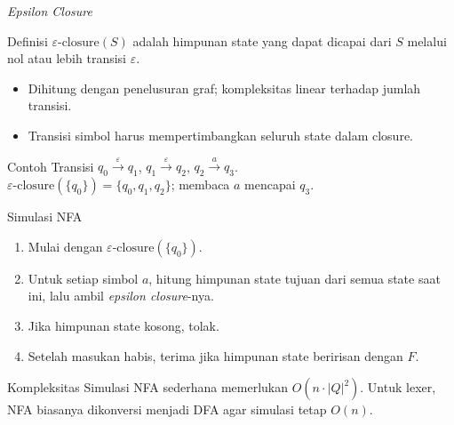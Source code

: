 \documentclass[aspectratio=169,10pt,t]{beamer}
\begin{document}
\begin{frame}{\textit{Epsilon Closure}}
  \begin{block}{Definisi}
    \small
    \(\varepsilon\text{-closure}(S)\) adalah himpunan state yang dapat
    dicapai dari \(S\) melalui nol atau lebih transisi
    \(\varepsilon\).
  \end{block}

  \begin{itemize}
    \item Dihitung dengan penelusuran graf; kompleksitas linear terhadap
          jumlah transisi.
    \item Transisi simbol harus mempertimbangkan seluruh state dalam
          closure.
  \end{itemize}

  \vspace{3pt}
  \begin{exampleblock}{Contoh}
    \footnotesize
    Transisi \(q_0 \xrightarrow{\varepsilon} q_1\),
    \(q_1 \xrightarrow{\varepsilon} q_2\),
    \(q_2 \xrightarrow{a} q_3\).\\
    \(\varepsilon\text{-closure}(\{q_0\}) = \{q_0,q_1,q_2\}\);
    membaca \(a\) mencapai \(q_3\).
  \end{exampleblock}
\end{frame}

\begin{frame}{Simulasi NFA}
  \begin{enumerate}
    \setlength{\itemsep}{3pt}
    \item Mulai dengan \(\varepsilon\text{-closure}(\{q_0\})\).
    \item Untuk setiap simbol \(a\), hitung himpunan state tujuan dari
          semua state saat ini, lalu ambil \textit{epsilon closure}-nya.
    \item Jika himpunan state kosong, tolak.
    \item Setelah masukan habis, terima jika himpunan state beririsan
          dengan \(F\).
  \end{enumerate}

  \vspace{5pt}
  \begin{block}{Kompleksitas}
    \footnotesize
    Simulasi NFA sederhana memerlukan \(O(n \cdot |Q|^2)\). Untuk lexer,
    NFA biasanya dikonversi menjadi DFA agar simulasi tetap \(O(n)\).
  \end{block}
\end{frame}
\end{document}
